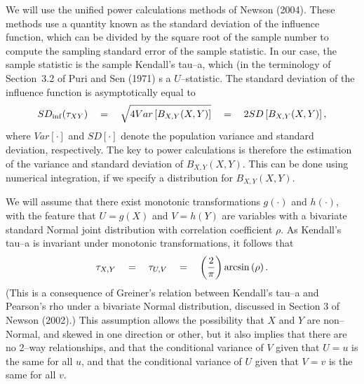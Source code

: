 \documentclass[a4paper]{article}      %
\begin{document}
We will use the unified power calculations methods of Newson (2004)\cite{newson2004}.
These methods use a quantity known as the standard deviation of the influence function,
which can be divided by the square root of the sample number to compute
the sampling standard error of the sample statistic.
In our case, the sample statistic is the sample Kendall's tau--a,
which (in the terminology of Section~3.2 of Puri and Sen (1971)\cite{purisen1971}
s a $U$--statistic.
The standard deviation of the influence function is asymptotically equal to
\def\sdinf{SD_{\rm inf}}
\begin{equation}
\sdinf(\tau_{XY}) \quad = \quad \sqrt{ 4 Var\left[B_{X,Y}(X,Y)\right] } \quad = \quad 2 SD\left[B_{X,Y}(X,Y)\right],
\label{eq:eqseq4}
\end{equation}
where $Var[\cdot]$ and $SD[\cdot]$ denote the population variance and standard deviation,
respectively.
The key to power calculations is therefore the estimation
of the variance and standard deviation of $B_{X,Y}(X,Y)$.
This can be done using numerical integration,
if we specify a distribution for $B_{X,Y}(X,Y)$.

We will assume that there exist monotonic transformations $g(\cdot)$ and $h(\cdot)$,
with the feature that $U=g(X)$ and $V=h(Y)$ are variables with a bivariate standard Normal joint distribution
with correlation coefficient $\rho$.
As Kendall's tau--a is invariant under monotonic transformations,
it follows that
\begin{equation}
\tau_{X,Y} \quad = \quad \tau_{U,V} \quad = \quad \left({2\over\pi}\right)\arcsin\left(\rho\right).
\label{eq:eqseq5}
\end{equation}
(This is a consequence of Greiner's relation between Kendall's tau--a and Pearson's rho under a bivariate Normal distribution,
discussed in Section 3 of Newson (2002)\cite{newson2002}.)
This assumption allows the possibility that $X$ and $Y$ are non--Normal,
and skewed in one direction or other,
but it also implies that there are no 2--way relationships,
and that the conditional variance of $V$ given that $U=u$ is the same for all $u$,
and that the conditional variance of $U$ given that $V=v$ is the same for all $v$.
\end{document}
